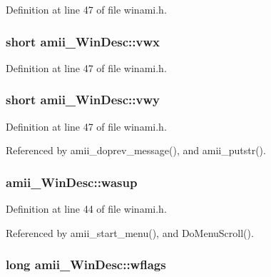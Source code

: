 Definition at line 47 of file winami.\+h.

\hypertarget{structamii__WinDesc_a07fca2931c9e79f29b19e238ee73de0d}{
\subsubsection[{vwx}]{\setlength{\rightskip}{0pt plus 5cm}short amii\+\_\+\+Win\+Desc\+::vwx}}\label{structamii__WinDesc_a07fca2931c9e79f29b19e238ee73de0d}


Definition at line 47 of file winami.\+h.

\hypertarget{structamii__WinDesc_a55e0b7473323fe60385ad4750437b831}{
\subsubsection[{vwy}]{\setlength{\rightskip}{0pt plus 5cm}short amii\+\_\+\+Win\+Desc\+::vwy}}\label{structamii__WinDesc_a55e0b7473323fe60385ad4750437b831}


Definition at line 47 of file winami.\+h.



Referenced by amii\+\_\+doprev\+\_\+message(), and amii\+\_\+putstr().

\hypertarget{structamii__WinDesc_ab4e4bdac6ab87e8f1cf420814f09e876}{
\subsubsection[{wasup}]{ amii\+\_\+\+Win\+Desc\+::wasup}}\label{structamii__WinDesc_ab4e4bdac6ab87e8f1cf420814f09e876}


Definition at line 44 of file winami.\+h.



Referenced by amii\+\_\+start\+\_\+menu(), and Do\+Menu\+Scroll().

\hypertarget{structamii__WinDesc_a4400afb6488c6a7b1f70f27ee0371963}{
\subsubsection[{wflags}]{\setlength{\rightskip}{0pt plus 5cm}long amii\+\_\+\+Win\+Desc\+::wflags}}\label{structamii__WinDesc_a4400afb6488c6a7b1f70f27ee0371963}


